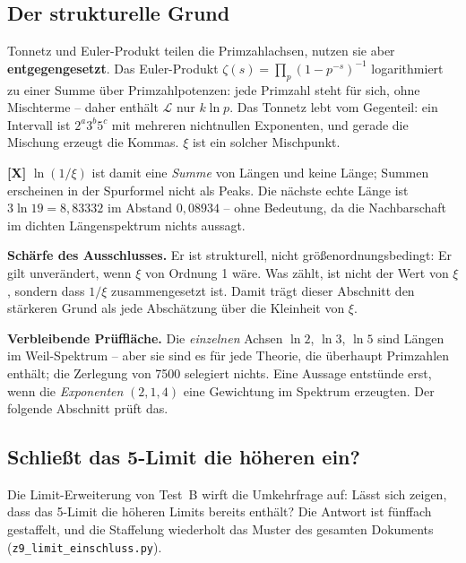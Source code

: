\subsection{Der strukturelle Grund}

\begin{keyresult}
Tonnetz und Euler-Produkt teilen die Primzahlachsen, nutzen sie aber
\textbf{entgegengesetzt}. Das Euler-Produkt
$\zeta(s) = \prod_p (1-p^{-s})^{-1}$ logarithmiert zu einer Summe
\"uber Primzahlpotenzen: jede Primzahl steht f\"ur sich, ohne
Mischterme -- daher enth\"alt $\mathcal{L}$ nur $k\ln p$. Das Tonnetz
lebt vom Gegenteil: ein Intervall ist $2^a 3^b 5^c$ mit mehreren
nichtnullen Exponenten, und gerade die Mischung erzeugt die Kommas.
$\xi$ ist ein solcher Mischpunkt.
\end{keyresult}

\textbf{[X]} $\ln(1/\xi)$ ist damit eine \emph{Summe} von L\"angen und
keine L\"ange; Summen erscheinen in der Spurformel nicht als Peaks. Die
n\"achste echte L\"ange ist $3\ln 19 = 8{,}83332$ im Abstand
$0{,}08934$ -- ohne Bedeutung, da die Nachbarschaft im dichten
L\"angenspektrum nichts aussagt.

\textbf{Sch\"arfe des Ausschlusses.} Er ist strukturell, nicht
gr\"o\ss enordnungsbedingt: Er gilt unver\"andert, wenn $\xi$ von
Ordnung 1 w\"are. Was z\"ahlt, ist nicht der Wert von $\xi$, sondern
dass $1/\xi$ zusammengesetzt ist. Damit tr\"agt dieser Abschnitt den
st\"arkeren Grund als jede Absch\"atzung \"uber die Kleinheit von $\xi$.

\textbf{Verbleibende Pr\"uffl\"ache.} Die \emph{einzelnen} Achsen
$\ln 2$, $\ln 3$, $\ln 5$ sind L\"angen im Weil-Spektrum -- aber sie
sind es f\"ur jede Theorie, die \"uberhaupt Primzahlen enth\"alt; die
Zerlegung von 7500 selegiert nichts. Eine Aussage entst\"unde erst,
wenn die \emph{Exponenten} $(2,1,4)$ eine Gewichtung im Spektrum
erzeugten. Der folgende Abschnitt pr\"uft das.

\subsection{Schlie\ss t das 5-Limit die h\"oheren ein?}
\label{sec:einschluss}

Die Limit-Erweiterung von Test~B wirft die Umkehrfrage auf: L\"asst sich
zeigen, dass das 5-Limit die h\"oheren Limits bereits enth\"alt? Die
Antwort ist f\"unffach gestaffelt, und die Staffelung wiederholt das
Muster des gesamten Dokuments
(\texttt{z9\_limit\_einschluss.py}).

